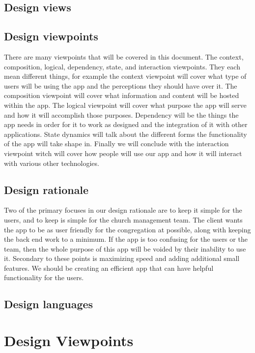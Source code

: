 \documentclass[letterpaper,10pt,draftclsnofoot,onecolumn,titlepage]{IEEEtran}
\begin{document}
		\subsection{Design views}
		
		\subsection{Design viewpoints}
		There are many viewpoints that will be covered in this document. 
		The context, composition, logical, dependency, state, and interaction viewpoints. 
		They each mean different things, for example the context viewpoint will cover what type of users will be using the app and the perceptions they should have over it. 
		The composition viewpoint will cover what information and content will be hosted within the app. 
		The logical viewpoint will cover what purpose the app will serve and how it will accomplish those purposes. 
		Dependency will be the things the app needs in order for it to work as designed and the integration of it with other applications. 
		State dynamics will talk about the different forms the functionality of the app will take shape in. 
		Finally we will conclude with the interaction viewpoint witch will cover how people will use our app and how it will interact with various other technologies. 
		\subsection{Design rationale}
		Two of the primary focuses in our design rationale are to keep it simple for the users, and to keep is simple for the church management team. 
		The client wants the app to be as user friendly for the congregation at possible, along with keeping the back end work to a minimum. 
		If the app is too confusing for the users or the team, then the whole purpose of this app will be voided by their inability to use it. 
		Secondary to these points is maximizing speed and adding additional small features. 
		We should be creating an efficient app that can have helpful functionality for the users. 
		\subsection{Design languages}
		
	\section{Design Viewpoints}
	
\end{document}
